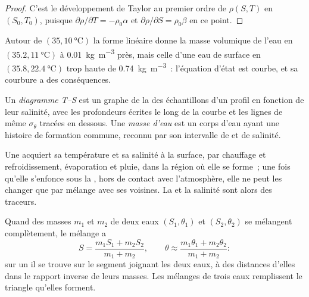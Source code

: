 \begin{proof}
C'est le développement de Taylor au premier ordre de $\rho(S, T)$ en $(S_0, T_0)$, puisque
$\partial\rho/\partial T = -\rho_0\alpha$ et $\partial\rho/\partial S =
\rho_0\beta$ en ce point.
\end{proof}

Autour de $(35, \qty{10}{\celsius})$ la forme linéaire donne la masse volumique de l'eau en
$(35.2, \qty{11}{\celsius})$ à \qty{0.01}{kg.m^{-3}} près, mais celle d'une eau de surface
en $(35.8, \qty{22.4}{\celsius})$ trop haute de \qty{0.74}{kg.m^{-3}}~:
l'équation d'état est courbe, et sa courbure a des conséquences.

\begin{definition}\label{def:b1:fluid-envelopes-structure:ts-diagram}
Un \emph{diagramme T--S} est un graphe de la  des échantillons d'un profil en fonction de leur salinité, avec les profondeurs
écrites le long de la courbe et les lignes de même $\sigma_\theta$ tracées en dessous.
Une \emph{masse d'eau} est un corps d'eau ayant une histoire de formation
commune, reconnu par son intervalle de  et de salinité.
\end{definition}

Une  acquiert sa température et sa salinité à la surface, par
chauffage et refroidissement, évaporation et pluie, dans la région où elle se forme~; une fois qu'elle
s'enfonce sous la , hors de contact avec l'atmosphère, elle ne peut les changer
que par mélange avec ses voisines. La  et la salinité sont
alors des traceurs.

\begin{proposition}\label{prop:b1:fluid-envelopes-structure:mixing}
Quand des masses $m_1$ et $m_2$ de deux eaux $(S_1, \theta_1)$ et $(S_2, \theta_2)$
se mélangent complètement, le mélange a
\[
  S = \frac{m_1 S_1 + m_2 S_2}{m_1 + m_2},\qquad
  \theta \approx \frac{m_1 \theta_1 + m_2 \theta_2}{m_1 + m_2}:
\]
sur un  il se trouve sur le segment joignant les deux eaux, à des distances
d'elles dans le rapport inverse de leurs masses. Les mélanges de trois eaux remplissent le
triangle qu'elles forment.
\end{proposition}

